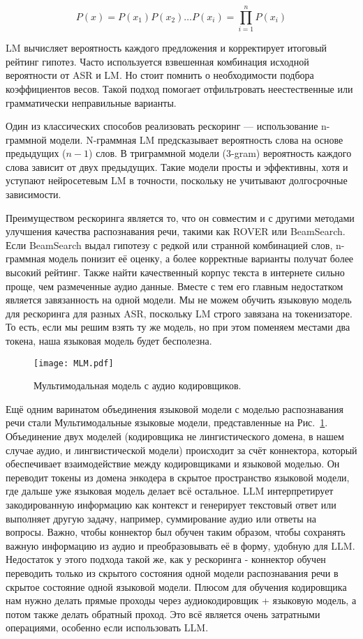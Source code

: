 \begin{equation}
  P(x) = P(x_1)P(x_2)\dots P(x_i) = \prod_{i=1}^{n}P(x_i)
  \label{eq:perp}
\end{equation}

LM вычисляет вероятность каждого предложения и корректирует итоговый рейтинг гипотез.
Часто используется взвешенная комбинация исходной вероятности от ASR и LM.
Но стоит помнить о необходимости подбора коэффициентов весов.
Такой подход помогает отфильтровать неестественные или грамматически неправильные варианты.

Один из классических способов реализовать рескоринг — использование n-граммной модели.
N-граммная LM предсказывает вероятность слова на основе предыдущих ($n-1$) слов.
В триграммной модели (3-gram) вероятность каждого слова зависит от двух предыдущих.
Такие модели просты и эффективны, хотя и уступают нейросетевым LM в точности, поскольку не учитывают долгосрочные зависимости.

Преимуществом рескоринга является то, что он совместим и с другими методами улучшения качества распознавания речи, такими как ROVER или BeamSearch.
Если BeamSearch выдал гипотезу с редкой или странной комбинацией слов, n-граммная модель понизит её оценку, а более корректные варианты получат более высокий рейтинг.
Также найти качественный корпус текста в интернете сильно проще, чем размеченные аудио данные.
Вместе с тем его главным недостатком является завязанность на одной модели.
Мы не можем обучить языковую модель для рескоринга для разных ASR, поскольку LM строго завязана на токенизаторе.
То есть, если мы решим взять ту же модель, но при этом поменяем местами два токена, наша языковая модель будет бесполезна.

\begin{figure}[!t]
  \centering
  \texttt{[image: MLM.pdf]}
  \caption{Мультимодальная модель с аудио кодировщиков.}
  \label{fig:mlm}
\end{figure}

Ещё одним варинатом объединения языковой модели с моделью распознавания речи стали Мультимодальные языковые модели, представленные на Рис.~\ref{fig:mlm}.
Объединение двух моделей (кодировщика не лингистического домена, в нашем случае аудио, и лингвистической модели) происходит за счёт коннектора, который обеспечивает взаимодействие между кодировщиками и языковой моделью.
Он переводит токены из домена энкодера в скрытое пространство языковой модели, где дальше уже языковая модель делает всё остальное.
LLM интерпретирует закодированную информацию как контекст и генерирует текстовый ответ или выполняет другую задачу, например, суммирование аудио или ответы на вопросы.
Важно, чтобы коннектор был обучен таким образом, чтобы сохранять важную информацию из аудио и преобразовывать её в форму, удобную для LLM.
Недостаток у этого подхода такой же, как у рескоринга - коннектор обучен переводить только из скрытого состояния одной модели распознавания речи в скрытое состояние одной языковой модели.
Плюсом для обучения кодировщика нам нужно делать прямые проходы через аудиокодировщик + языковую модель, а потом также делать обратный проход.
Это всё является очень затратными операциями, особенно если использовать LLM.
